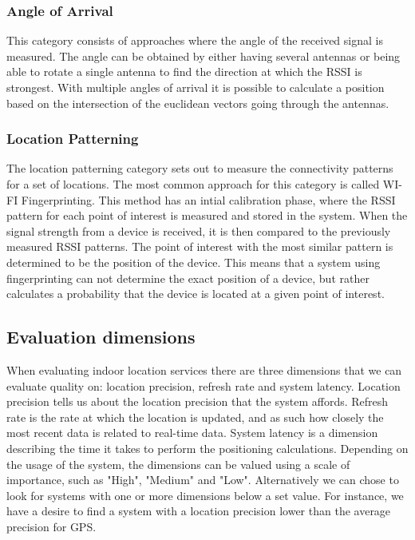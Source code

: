 \subsubsection*{Angle of Arrival}
This category consists of approaches where the angle of the received signal is measured. The angle can be obtained by either having several antennas or being able to rotate a single antenna to find the direction at which the RSSI is strongest. With multiple angles of arrival it is possible to calculate a position based on the intersection of the euclidean vectors going through the antennas.

\subsubsection*{Location Patterning}
The location patterning category sets out to measure the connectivity patterns for a set of locations. The most common approach for this category is called WI-FI Fingerprinting. This method has an intial calibration phase, where the RSSI pattern for each point of interest is measured and stored in the system. When the signal strength from a device is received, it is then compared to the previously measured RSSI patterns. The point of interest with the most similar pattern is determined to be the position of the device. This means that a system using fingerprinting can not determine the exact position of a device, but rather calculates a probability that the device is located at a given point of interest\cite{fingerprint1}.

\subsection{Evaluation dimensions}
When evaluating indoor location services there are three dimensions that we can evaluate quality on: location precision, refresh rate and system latency. Location precision tells us about the location precision that the system affords. Refresh rate is the rate at which the location is updated, and as such how closely the most recent data is related to real-time data. System latency is a dimension describing the time it takes to perform the positioning calculations\cite{dimensions}. Depending on the usage of the system, the dimensions can be valued using a scale of importance, such as "High", "Medium" and "Low". Alternatively we can chose to look for systems with one or more dimensions below a set value. For instance, we have a desire to find a system with a location precision lower than the average precision for GPS. 


